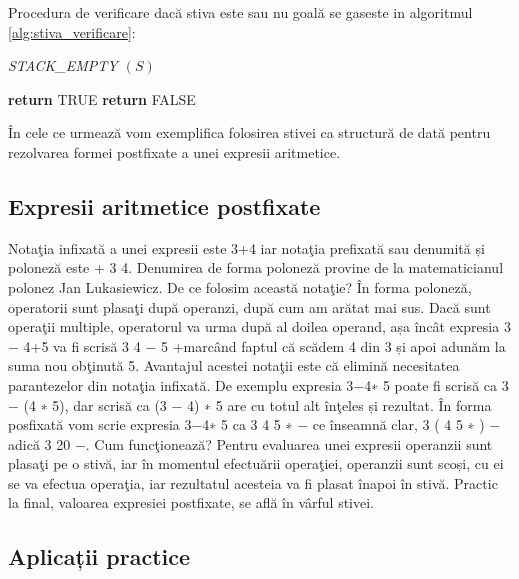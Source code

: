 Procedura de verificare dacă stiva este sau nu goală se gaseste in algoritmul \ref{alg:stiva_verificare}:

\begin{algorithm} [H]
	\caption{\textit{STACK\_EMPTY $\left ( S \right )$}}\label{alg:stiva_verificare}
	\begin{algorithmic}[1]
		\State \textbf{return} TRUE	
		\Else 
		\State \textbf{return} FALSE
		\EndIf				
	\end{algorithmic}
\end{algorithm}

În cele ce urmează vom exemplifica folosirea stivei ca structură de dată pentru rezolvarea formei postfixate a unei expresii aritmetice.

\subsection{Expresii aritmetice postfixate}

Notaţia infixată a unei expresii este 3+4 iar notaţia prefixată sau denumită și poloneză este + 3 4. Denumirea de forma poloneză provine de la matematicianul polonez Jan Lukasiewicz. De ce folosim această notaţie? În forma poloneză, operatorii sunt plasaţi după operanzi, după cum am arătat mai sus. Dacă sunt operaţii multiple, operatorul va urma după al doilea operand, așa încât expresia 3 − 4+5 va fi scrisă 3 4 − 5 +marcând faptul că scădem 4 din 3 și apoi adunăm la suma nou obţinută 5. Avantajul acestei notaţii este că elimină necesitatea parantezelor din notaţia infixată. De exemplu expresia 3−4∗ 5 poate fi scrisă ca 3 − (4 ∗ 5), dar scrisă ca (3 − 4) ∗ 5 are cu totul alt înţeles și rezultat. În forma posfixată vom scrie expresia 3−4∗ 5 ca 3 4 5 ∗ − ce înseamnă clar, 3 ( 4 5 ∗ ) −
adică 3 20 −.
Cum funcţionează? Pentru evaluarea unei expresii operanzii sunt plasaţi pe o stivă, iar în
momentul efectuării operaţiei, operanzii sunt scoși, cu ei se va efectua operaţia, iar rezultatul acesteia va fi plasat înapoi în stivă. Practic la final, valoarea expresiei postfixate, se află în vârful stivei.

\subsection{Aplicații practice}

